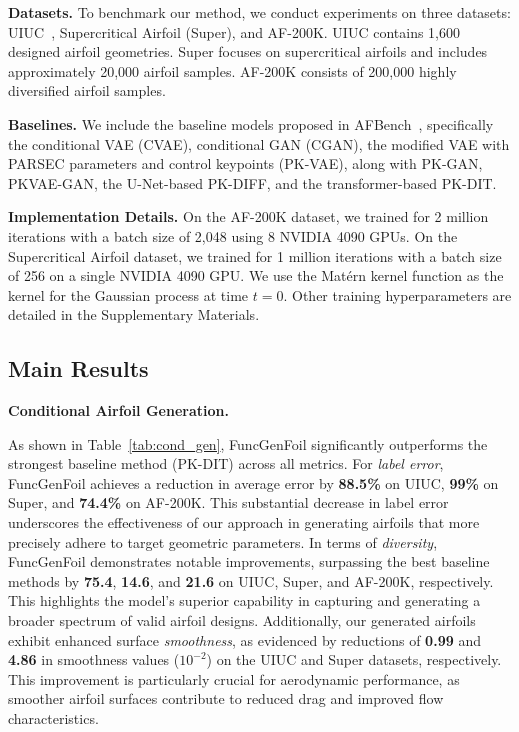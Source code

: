 \noindent\textbf{Datasets.} To benchmark our method, we conduct experiments on three datasets: UIUC~\cite{selig1996uiuc}, Supercritical Airfoil (Super), and AF-200K.
UIUC contains 1,600 designed airfoil geometries.
Super focuses on supercritical airfoils and includes approximately 20,000 airfoil samples.
AF-200K consists of 200,000 highly diversified airfoil samples.

\noindent\textbf{Baselines.} We include the baseline models proposed in AFBench~\cite{liu2024afbench}, specifically the conditional VAE (CVAE), conditional GAN (CGAN), the modified VAE with PARSEC parameters and control keypoints (PK-VAE), along with PK-GAN, PKVAE-GAN, the U-Net-based PK-DIFF, and the transformer-based PK-DIT.





\noindent\textbf{Implementation Details.} On the AF-200K dataset, we trained for 2 million iterations with a batch size of 2,048 using 8 NVIDIA 4090 GPUs. On the Supercritical Airfoil dataset, we trained for 1 million iterations with a batch size of 256 on a single NVIDIA 4090 GPU. We use the Matérn kernel function as the kernel for the Gaussian process at time $t=0$. Other training hyperparameters are detailed in the Supplementary Materials.

\subsection{Main Results}
\noindent\textbf{Conditional Airfoil Generation.}

As shown in Table~\ref{tab:cond_gen}, FuncGenFoil significantly outperforms the strongest baseline method (PK-DIT) across all metrics.
For \textit{label error}, FuncGenFoil achieves a reduction in average error by \textbf{88.5\%} on UIUC, \textbf{99\%} on Super, and \textbf{74.4\%} on AF-200K.
This substantial decrease in label error underscores the effectiveness of our approach in generating airfoils that more precisely adhere to target geometric  parameters.
In terms of \textit{diversity}, FuncGenFoil demonstrates notable improvements, surpassing the best baseline methods by \textbf{75.4}, \textbf{14.6}, and \textbf{21.6} on UIUC, Super, and AF-200K, respectively.
This highlights the model's superior capability in capturing and generating a broader spectrum of valid airfoil designs.
Additionally, our generated airfoils exhibit enhanced surface \textit{smoothness}, as evidenced by reductions of \textbf{0.99} and \textbf{4.86} in smoothness values ($10^{-2}$) on the UIUC and Super datasets, respectively.
This improvement is particularly crucial for aerodynamic performance, as smoother airfoil surfaces contribute to reduced drag and improved flow characteristics.

